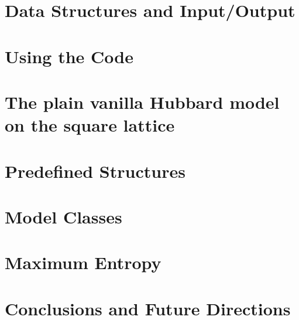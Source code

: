 \documentclass[submission, PhysCodeb]{SciPost}
\begin{document}










\section{Data Structures and Input/Output}\label{sec:imp}


\section{Using the Code}\label{sec:running}

\section{The plain vanilla Hubbard model on the square lattice} \label{sec:vanilla}

\section{Predefined Structures}\label{sec:predefined}

\section{Model Classes}\label{sec:model_classes}

\section{Maximum Entropy}\label{sec:maxent}

\section{Conclusions and Future Directions}\label{sec:con}


\begin{appendix}



\end{appendix}

\printindex

\nolinenumbers
\end{document}
